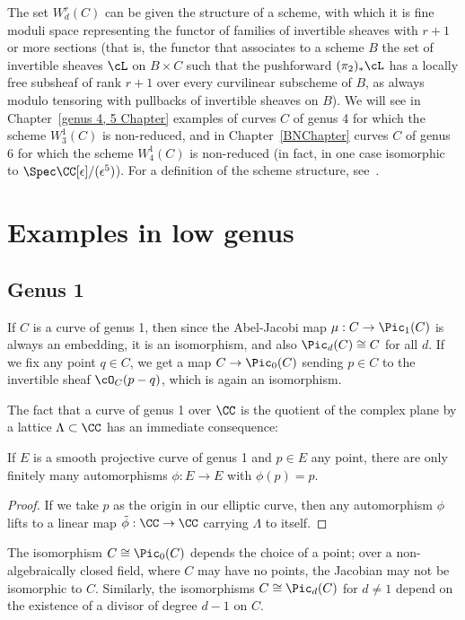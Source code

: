 The set $W^r_d(C)$ can be given the structure of a scheme, with which it is fine moduli space representing the functor of families of invertible sheaves with $r+1$ or more sections (that is, the functor that associates to a scheme $B$ the set of invertible sheaves $\cL$ on $B \times C$ such that the pushforward $(\pi_2)_*\cL$ has a locally free subsheaf of rank $r+1$ over every curvilinear subscheme of $B$, as always modulo tensoring with pullbacks of invertible sheaves on $B$). We will see in Chapter~\ref{genus 4, 5 Chapter} examples of curves $C$ of genus 4 for which the scheme $W^1_3(C)$ is non-reduced, and in Chapter~\ref{BNChapter} curves $C$ of genus 6 for which the scheme $W^1_4(C)$ is non-reduced (in fact, in one case  isomorphic to $\Spec \CC[\epsilon]/(\epsilon^5)$). For a definition of the scheme structure, see~\cite[Section IV.3]{ACGH}. 

\section{Examples in low genus}

\subsection{Genus 1} 

If $C$ is a curve of genus 1, then since the Abel-Jacobi map $\mu : C \to \Pic_1(C)$ is always an embedding, it is an isomorphism, and also $\Pic_d(C) \cong C$ for all $d$. If we fix any point $q \in C$, we get a map $C \to \Pic_0(C)$ sending $p \in C$ to the invertible sheaf $\cO_C(p-q)$, which is again an isomorphism.

The fact that a curve of genus 1 over $\CC$ is the quotient of the complex plane by a lattice $\Lambda \subset \CC$ has an immediate consequence:

\begin{corollary}\label{finite automorphism genus 1}
If $E$ is a smooth projective curve of genus 1 and $p \in E$ any point, there are only finitely many automorphisms $\phi : E \to E$ with $\phi(p) = p$.
\end{corollary}

\begin{proof}
If we take $p$ as the origin in our elliptic curve, then any automorphism $\phi$ lifts to a linear map $\tilde \phi : \CC \to \CC$ carrying $\Lambda$ to itself.
\end{proof} 

The isomorphism $C \cong \Pic_0(C)$  depends the choice of a point; over a non-algebraically closed field, where $C$ may have no points, the Jacobian may not be isomorphic to $C$. Similarly, the isomorphisms $C \cong \Pic_d(C)$
for $d \neq 1$ depend on the existence of a divisor of degree $d-1$ on $C$.

